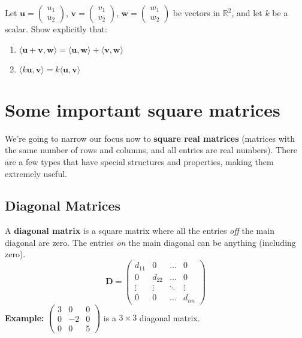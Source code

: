 \documentclass[11pt]{article}
\begin{document}
\begin{exercise}
    Let $\mathbf{u} = \begin{pmatrix} u_1 \\ u_2 \end{pmatrix}$, $\mathbf{v} = \begin{pmatrix} v_1 \\ v_2 \end{pmatrix}$, $\mathbf{w} = \begin{pmatrix} w_1 \\ w_2 \end{pmatrix}$ be vectors in $\mathbb{R}^2$, and let $k$ be a scalar.
Show explicitly that:
\begin{enumerate}
    \item $\langle \mathbf{u} + \mathbf{v}, \mathbf{w} \rangle = \langle \mathbf{u}, \mathbf{w} \rangle + \langle \mathbf{v}, \mathbf{w} \rangle$
    \item $\langle k\mathbf{u}, \mathbf{v} \rangle = k \langle \mathbf{u}, \mathbf{v} \rangle$
\end{enumerate}
\end{exercise}


\section{Some important square matrices}

We're going to narrow our focus now to \textbf{square real matrices} (matrices with the same number of rows and columns, and all entries are real numbers). There are a few types that have special structures and properties, making them extremely useful.

\subsection{Diagonal Matrices}
A \textbf{diagonal matrix} is a square matrix where all the entries \textit{off} the main diagonal are zero. The entries \textit{on} the main diagonal can be anything (including zero).
\[ \mathbf{D} = \begin{pmatrix}
d_{11} & 0 & \dots & 0 \\
0 & d_{22} & \dots & 0 \\
\vdots & \vdots & \ddots & \vdots \\
0 & 0 & \dots & d_{nn}
\end{pmatrix} \]
\textbf{Example:} $\begin{pmatrix} 3 & 0 & 0 \\ 0 & -2 & 0 \\ 0 & 0 & 5 \end{pmatrix}$ is a $3 \times 3$ diagonal matrix.
\end{document}
